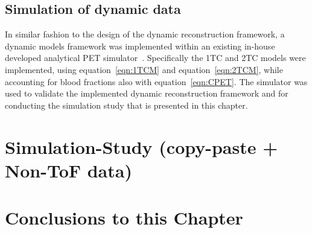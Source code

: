 \subsection{Simulation of dynamic data}
In similar fashion to the design of the dynamic reconstruction framework, a dynamic models framework was implemented within an existing in-house developed analytical PET simulator~\cite{Stute2015}. Specifically the 1TC and 2TC models were implemented, using equation~\ref{eqn:1TCM} and equation~\ref{eqn:2TCM}, while accounting for blood fractions also with equation~\ref{eqn:CPET}. 
The simulator was used to validate the implemented dynamic reconstruction framework and for conducting the simulation study that is presented in this chapter.

\section{Simulation-Study (copy-paste + Non-ToF data)}
%
%

\section{Conclusions to this Chapter}